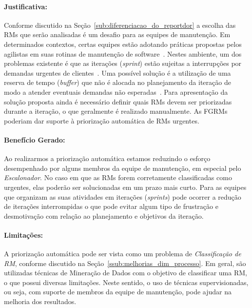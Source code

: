 \paragraph{Justificativa:}
\label{par:justificativa_s07}

Conforme discutido na Seção~\ref{sub:diferenciacao_do_reportdor} a escolha das
RMs que serão analisadas é um desafio para as equipes de manutenção. Em
determinados contextos, certas equipes estão adotando práticas propostas pelos
agilistas em suas rotinas de manutenção de
software~\cite{svensson2005introducing}. Nestes ambiente, um dos problemas
existente é que as iterações (\textit{sprint}) estão sujeitas a interrupções
por demandas urgentes de clientes~\cite{bennett2000software}. Uma possível
solução é a utilização de uma reserva de tempo (\textit{buffer}) que não é
alocada no planejamento da iteração de modo a atender eventuais demandas não
esperadas~\cite{schwaber2002agile}. Para apresentação da solução proposta ainda
é necessário definir quais RMs devem ser priorizadas durante a iteração, o que
geralmente é realizado manualmente. As FGRMs poderiam dar suporte à priorização
automática de RMs urgentes.

\paragraph{Benefício Gerado:}\label{par:papéis_afetados_s07}

Ao realizarmos a priorização automática estamos reduzindo o esforço
desempenhado por alguns membros da equipe de manutenção, em especial pelo
\textit{Escalonador}. No caso em que as RMs forem corretamente classificadas
como urgentes, elas poderão ser solucionadas em um prazo mais curto. Para as
equipes que organizam as suas atividades em iterações (\textit{sprints}) pode
ocorrer a redução de iterações interrompidas o que pode evitar algum tipo de
frustração e desmotivação com relação ao planejamento e objetivos da iteração.

\paragraph{Limitações:}
\label{par:limitacoes_s07}

A priorização automática pode ser vista como um problema de
\textit{Classificação de RM}, conforme discutido na
Seção~\ref{ssub:melhorias_dim_processo}. Em geral, são utilizadas técnicas de
Mineração de Dados com o objetivo de classificar uma RM, o que possui diversas
limitações. Neste sentido, o uso de técnicas supervisionadas, ou seja, com
suporte de membros da equipe de manutenção, pode ajudar na melhoria dos
resultados.

